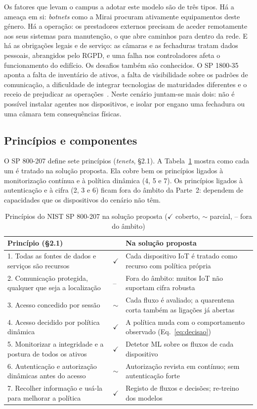 \documentclass[conference,a4paper]{IEEEtran}
\newcommand{\checkok}{$\checkmark$} %
\newcommand{\nao}{--}            %
\begin{document}
Os fatores que levam o campus a adotar este modelo são de três tipos. Há a ameaça em si:
\textit{botnets} como a Mirai procuram ativamente equipamentos deste género. Há a
operação: os prestadores externos precisam de aceder remotamente aos seus sistemas para
manutenção, o que abre caminhos para dentro da rede. E há as obrigações legais e de
serviço: as câmaras e as fechaduras tratam dados pessoais, abrangidos pelo RGPD, e uma
falha nos controladores afeta o funcionamento do edifício. Os desafios também são
conhecidos. O SP 1800-35 aponta a falta de inventário de ativos, a falta de visibilidade
sobre os padrões de comunicação, a dificuldade de integrar tecnologias de maturidades
diferentes e o receio de prejudicar as operações~\cite{nccoe2025zta}. Neste cenário
juntam-se mais dois: não é possível instalar agentes nos dispositivos, e isolar por
engano uma fechadura ou uma câmara tem consequências físicas.

\subsection{Princípios e componentes}
O SP 800-207 define sete princípios (\textit{tenets}, §2.1). A
Tabela~\ref{tab:zta_principios} mostra como cada um é tratado na solução proposta.
Ela cobre bem os princípios ligados à monitorização contínua e à política dinâmica
(4, 5 e 7). Os princípios ligados à autenticação e à cifra (2, 3 e 6) ficam fora do
âmbito da Parte~2: dependem de capacidades que os dispositivos do cenário não têm.

\begin{table}[H]
\caption{Princípios do NIST SP 800-207 na solução proposta (\checkok{} coberto, $\sim$ parcial, \nao{} fora do âmbito)}\label{tab:zta_principios}
\centering\footnotesize
\begin{tabular}{@{}p{}p{}p{}@{}}
\toprule
Princípio (§2.1) & & Na solução proposta \\
\midrule
1. Todas as fontes de dados e serviços são recursos & \checkok & Cada dispositivo IoT é tratado como recurso com política própria \\
2. Comunicação protegida, qualquer que seja a localização & \nao & Fora do âmbito: muitos IoT não suportam cifra robusta \\
3. Acesso concedido por sessão & $\sim$ & Cada fluxo é avaliado; a quarentena corta também as ligações já abertas \\
4. Acesso decidido por política dinâmica & \checkok & A política muda com o comportamento observado (Eq.~\ref{eq:decisao}) \\
5. Monitorizar a integridade e a postura de todos os ativos & \checkok & Detetor ML sobre os fluxos de cada dispositivo \\
6. Autenticação e autorização dinâmicas antes do acesso & $\sim$ & Autorização revista em contínuo; sem autenticação forte \\
7. Recolher informação e usá-la para melhorar a política & \checkok & Registo de fluxos e decisões; re-treino dos modelos \\
\bottomrule
\end{tabular}
\end{table}
\end{document}
